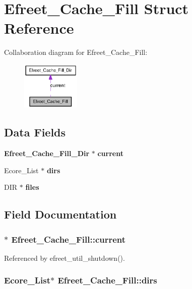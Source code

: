 \section{Efreet\_\-Cache\_\-Fill Struct Reference}
\label{structEfreet__Cache__Fill}
Collaboration diagram for Efreet\_\-Cache\_\-Fill:\nopagebreak
\begin{figure}[H]
\begin{center}
\leavevmode
\includegraphics[width=79pt]{structEfreet__Cache__Fill__coll__graph}
\end{center}
\end{figure}
\subsection*{Data Fields}
\begin{CompactItemize}
\item 
{\bf Efreet\_\-Cache\_\-Fill\_\-Dir} $\ast$ {\bf current}
\item 
Ecore\_\-List $\ast$ {\bf dirs}
\item 
DIR $\ast$ {\bf files}
\end{CompactItemize}


\subsection{Field Documentation}
\subsubsection[current]{$\ast$ {\bf Efreet\_\-Cache\_\-Fill::current}}\label{structEfreet__Cache__Fill_b3e5d76e1aeef11b21965616c16c7d97}




Referenced by efreet\_\-util\_\-shutdown().
\subsubsection[dirs]{\setlength{\rightskip}{0pt plus 5cm}Ecore\_\-List$\ast$ {\bf Efreet\_\-Cache\_\-Fill::dirs}}\label{structEfreet__Cache__Fill_7d762b5578ea695bf82aae406d08945d}




